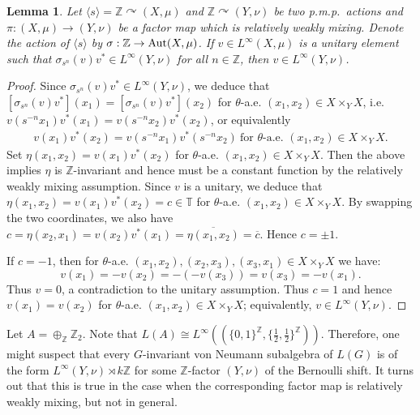 \documentclass[11pt]{amsart}
\newcommand{\Z}{\mathbb Z}
\theoremstyle{plain}
\newtheorem{lemma}[theorem]{Lemma}
\theoremstyle{definition}
\theoremstyle{remark}
\numberwithin{equation}{section}
\begin{document}
\begin{lemma}\label{lem: locate elements using relative weak mixing}
Let $\langle s\rangle=\mathbb{Z}\curvearrowright (X,\mu)$ and $\mathbb{Z}\curvearrowright (Y,\nu)$ be two p.m.p.\ actions and $\pi: (X,\mu)\rightarrow (Y,\nu)$ be a factor map which is relatively weakly mixing. Denote the action of $\langle s\rangle$ by $\sigma : \Z \to \textup{Aut}(X, \mu)$.  If $v\in L^{\infty}(X,\mu)$ is a unitary element such that $\sigma_{s^n}(v)v^*\in L^{\infty}(Y,\nu)$ for all $n\in\mathbb{Z}$, then $v\in L^{\infty}(Y,\nu)$. 
\end{lemma}
\begin{proof}
Since $\sigma_{s^n}(v)v^*\in L^{\infty}(Y,\nu)$, we deduce  that
$[\sigma_{s^n}(v)v^*](x_1)=[\sigma_{s^n}(v)v^*](x_2)$
 for $\theta$-a.e. $(x_1, x_2)\in X\times_YX$, i.e. $v(s^{-n}x_1)v^*(x_1)=v(s^{-n}x_2)v^*(x_2)$, or equivalently
 \begin{align*}
 v(x_1)v^*(x_2)=v(s^{-n}x_1)v^*(s^{-n}x_2)~\text{for  
 $\theta$-a.e. $(x_1, x_2)\in X\times_YX$}.
 \end{align*}
 Set $\eta(x_1,x_2)=v(x_1)v^*(x_2)$ for  $\theta$-a.e. $(x_1,x_2)\in X\times_YX$. Then the above implies $\eta$ is $\mathbb{Z}$-invariant and hence must be a constant function by the relatively weakly mixing assumption. Since $v$ is a unitary, we deduce that $\eta(x_1,x_2)=v(x_1)v^*(x_2)=c\in\mathbb{T}$ for  $\theta$-a.e. $(x_1,x_2)\in X\times_YX$. By swapping the two coordinates, we also have $c=\eta(x_2,x_1)=v(x_2)v^*(x_1)=\overline{\eta(x_1,x_2)}=\overline{c}$. Hence $c=\pm 1$. 

If $c=-1$, then  for  $\theta$-a.e. $(x_1,x_2),(x_2,x_3),(x_3,x_1)\in X\times_YX$ we have:
 $$v(x_1)=-v(x_2)=-(-v(x_3))=v(x_3)=-v(x_1).$$ Thus $v=0$, a contradiction to the unitary assumption. Thus $c=1$ and hence $v(x_1)=v(x_2)$ for  $\theta$-a.e. $(x_1,x_2)\in X\times_YX$; equivalently, $v\in L^{\infty}(Y,\nu)$.   %
\end{proof}
Let $A=\oplus_{\mathbb{Z}}\Z_2$. Note that $L(A)\cong L^{\infty}((\{0,1\}^{\mathbb{Z}}, \{\frac{1}{2},\frac{1}{2}\}^{\mathbb{Z}}))$. Therefore, one might suspect  that every $G$-invariant von Neumann subalgebra of $L(G)$ is of the form $L^{\infty}(Y,\nu)\rtimes k\mathbb{Z}$ for some $\mathbb{Z}$-factor $(Y,\nu)$ of the Bernoulli shift. It turns out that this is true in the case when the corresponding factor map is relatively weakly mixing, but not in general. 
\end{document}
